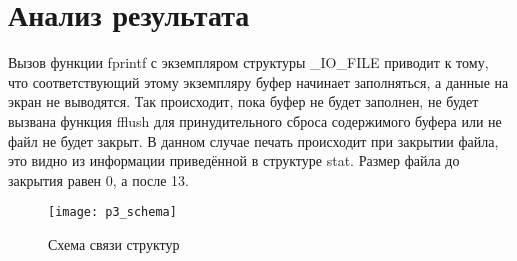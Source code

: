 \section*{Анализ результата}

Вызов функции fprintf с экземпляром структуры \_IO\_FILE приводит к тому, что соответствующий этому экземпляру буфер начинает заполняться, а данные на экран не выводятся. Так происходит, пока буфер не будет заполнен, не будет вызвана функция fflush для принудительного сброса содержимого буфера или не файл не будет закрыт. В данном случае печать происходит при закрытии файла, это видно из информации приведённой в структуре stat. Размер файла до закрытия равен 0, а после 13.

\begin{figure}[ht!]
	\centering
	\texttt{[image: p3\_schema]}
	\caption{Схема связи структур}
\end{figure}